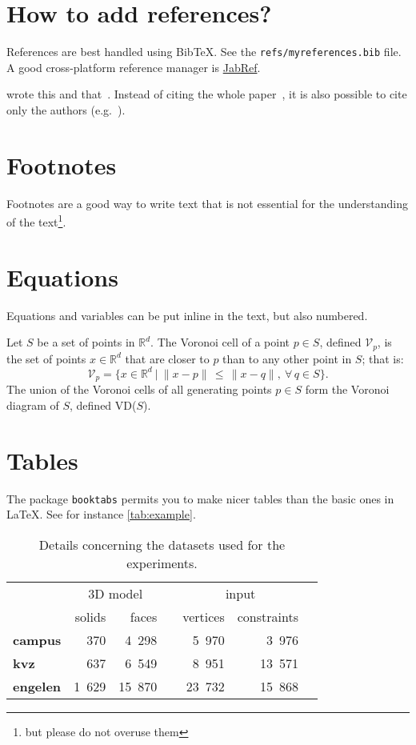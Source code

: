 \documentclass[a4paper,11pt,parskip=half]{scrartcl}
\newcommand{\eg}{e.g.}
\begin{document}
%
\section{How to add references?}

References are best handled using Bib\TeX.
See the \texttt{refs/myreferences.bib} file. 
A good cross-platform reference manager is \href{http://jabref.sourceforge.net/}{JabRef}.

\citet{Descartes37} wrote this and that~\citep{Voronoi08,Delaunay34}.
Instead of citing the whole paper~\citep{Delaunay34}, it is also possible to cite only the authors (\eg\ \citeauthor{Delaunay34}).

%
\section{Footnotes}

Footnotes are a good way to write text that is not essential for the understanding of the text\footnote{but please do not overuse them}.

%
\section{Equations}

Equations and variables can be put inline in the text, but also numbered.

Let $S$ be a set of points in $\mathbb{R}^d$. 
The Voronoi cell of a point $p \in S$, defined $\mathcal{V}_{p}$, is the set of points $x \in \mathbb{R}^d$ that are closer to $p$ than to any other point in $S$; that is:
\begin{equation}
\mathcal{V}_p = \{x \in \mathbb{R}^{d} \ | \ \|x-p\| \, \leq \, \|x-q\|, \ \forall \, q \in S \}. 
\end{equation}
The union of the Voronoi cells of all generating points $p \in S$ form the Voronoi diagram of $S$, defined VD($S$).



%
\section{Tables}

The package \texttt{booktabs} permits you to make nicer tables than the basic ones in \LaTeX.
See for instance \autoref{tab:example}.
\begin{table}
  \centering
  \begin{tabular}{@{}lrrcrrc@{}} \toprule
    & \multicolumn{2}{c}{3D model} && \multicolumn{2}{c}{input} \\
    \cmidrule{2-3}  \cmidrule{5-6} 
    & solids & faces && vertices & constraints  \\ 
    \toprule
    \textbf{campus}  & 370   & 4~298  && 5~970  & 3~976   \\
    \textbf{kvz}     & 637   & 6~549  && 8~951  & 13~571  \\
    \textbf{engelen} & 1~629 & 15~870 && 23~732 & 15~868 \\ 
    \bottomrule
   \end{tabular}
  \caption{Details concerning the datasets used for the experiments.}%
\label{tab:example}
\end{table}
\end{document}
